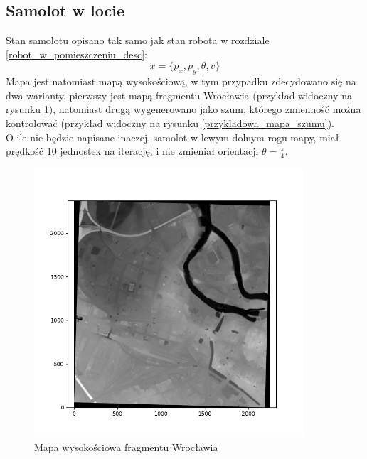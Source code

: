 \subsection{Samolot w locie}
Stan samolotu opisano tak samo jak stan robota w rozdziale \ref{robot_w_pomieszczeniu_desc}:
\begin{equation*}
	x = \{p_x,p_y,\theta,v\}
\end{equation*}
Mapa jest natomiast mapą wysokościową, w tym przypadku zdecydowano się na dwa warianty, pierwszy jest mapą fragmentu Wrocławia (przykład widoczny na rysunku \ref{przykladowa_mapa_wroclawia}), natomiast drugą wygenerowano jako szum, którego zmienność można kontrolować (przykład widoczny na rysunku \ref{przykladowa_mapa_szumu}).\\
O ile nie będzie napisane inaczej, samolot w lewym dolnym rogu mapy, miał prędkość 10 jednostek na iterację, i nie zmieniał orientacji $\theta=\frac{\pi}{4}$.
\begin{figure}[H]
	\begin{center}
		\includegraphics[width=10cm]{./przykladowa_mapa_wroclawia.png}
		\caption{Mapa wysokościowa fragmentu Wrocławia}
		\label{przykladowa_mapa_wroclawia}
	\end{center}
\end{figure}
